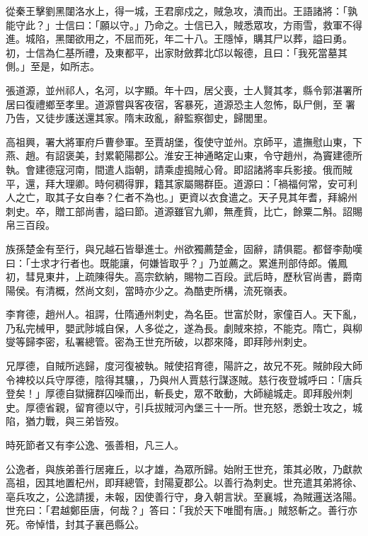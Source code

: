 \begin{pinyinscope}
 從秦王擊劉黑闥洛水上，得一城，王君廓戍之，賊急攻，潰而出。王語諸將：「孰能守此？」士信曰：「願以守。」乃命之。士信已入，賊悉眾攻，方雨雪，救軍不得進。城陷，黑闥欲用之，不屈而死，年二十八。王隱悼，購其尸以葬，謚曰勇。初，士信為仁基所禮，及東都平，出家財斂葬北邙以報德，且曰：「我死當墓其側。」至是，如所志。



 張道源，並州祁人，名河，以字顯。年十四，居父喪，士人賢其孝，縣令郭湛署所居曰復禮鄉至孝里。道源嘗與客夜宿，客暴死，道源恐主人忽怖，臥尸側，至署乃告，又徒步護送還其家。隋末政亂，辭監察御史，歸閭里。



 高祖興，署大將軍府戶曹參軍。至賈胡堡，復使守並州。京師平，遣撫慰山東，下燕、趙。有詔褒美，封累範陽郡公。淮安王神通略定山東，令守趙州，為竇建德所執。會建德寇河南，間遣人詣朝，請乘虛搗賊心脅。即詔諸將率兵影接。俄而賊平，還，拜大理卿。時何稠得罪，籍其家屬賜群臣。道源曰：「禍福何常，安可利人之亡，取其子女自奉？仁者不為也。」更資以衣食遣之。天子見其年耆，拜綿州刺史。卒，贈工部尚書，謚曰節。道源雖官九卿，無產貲，比亡，餘粟二斛。詔賜帛三百段。



 族孫楚金有至行，與兄越石皆舉進士。州欲獨薦楚金，固辭，請俱罷。都督李勣嘆曰：「士求才行者也。既能讓，何嫌皆取乎？」乃並薦之。累進刑部侍郎。儀鳳初，彗見東井，上疏陳得失。高宗欽納，賜物二百段。武后時，歷秋官尚書，爵南陽侯。有清概，然尚文刻，當時亦少之。為酷吏所構，流死嶺表。



 李育德，趙州人。祖諤，仕隋通州刺史，為名臣。世富於財，家僮百人。天下亂，乃私完械甲，嬰武陟城自保，人多從之，遂為長。劇賊來掠，不能克。隋亡，與柳燮等歸李密，私署總管。密為王世充所破，以郡來降，即拜陟州刺史。



 兄厚德，自賊所逃歸，度河復被執。賊使招育德，陽許之，故兄不死。賊帥段大師令裨校以兵守厚德，陰得其驤，，乃與州人賈慈行謀逐賊。慈行夜登城呼曰：「唐兵登矣！」厚德自獄擁群囚噪而出，斬長史，眾不敢動，大師縋城走。即拜殷州刺史。厚德省親，留育德以守，引兵拔賊河內堡三十一所。世充怒，悉銳士攻之，城陷，猶力戰，與三弟皆歿。



 時死節者又有李公逸、張善相，凡三人。



 公逸者，與族弟善行居雍丘，以才雄，為眾所歸。始附王世充，策其必敗，乃獻款高祖，因其地置杞州，即拜總管，封陽夏郡公。以善行為刺史。世充遣其弟將徐、亳兵攻之，公逸請援，未報，因使善行守，身入朝言狀。至襄城，為賊邏送洛陽。世充曰：「君越鄭臣唐，何哉？」答曰：「我於天下唯聞有唐。」賊怒斬之。善行亦死。帝悼惜，封其子襄邑縣公。




\end{pinyinscope}
